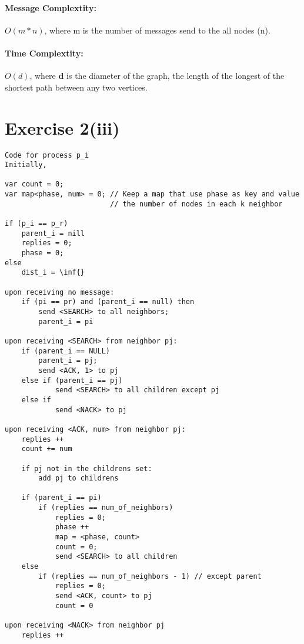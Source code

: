 \paragraph{Message Complextity:} $O(m*n)$, where m is the number of
messages send to the all nodes (n).

\paragraph{Time Complextity:} $O(d)$, where $\textbf{d}$ is the
diameter of the graph, the length of the longest of the shortest path
between any two vertices. 

\section*{Exercise 2(iii)}

\begin{lstlisting}[style=mycode]
Code for process p_i
Initially, 

var count = 0;
var map<phase, num> = 0; // Keep a map that use phase as key and value
						 // the number of nodes in each k neighbor

if (p_i == p_r)
	parent_i = nill
	replies = 0;
	phase = 0;
else
	dist_i = \inf{}

upon receiving no message:
	if (pi == pr) and (parent_i == null) then
		send <SEARCH> to all neighbors;
		parent_i = pi

upon receiving <SEARCH> from neighbor pj:
	if (parent_i == NULL)
		parent_i = pj;
		send <ACK, 1> to pj
	else if (parent_i == pj)
			send <SEARCH> to all children except pj
	else if 
			send <NACK> to pj

upon receiving <ACK, num> from neighbor pj:
	replies ++
	count += num

	if pj not in the childrens set:
		add pj to childrens

	if (parent_i == pi)
		if (replies == num_of_neighbors)
			replies = 0;
			phase ++
			map = <phase, count>
			count = 0;
			send <SEARCH> to all children
	else
		if (replies == num_of_neighbors - 1) // except parent
			replies = 0;
			send <ACK, count> to pj
			count = 0

upon receiving <NACK> from neighbor pj
	replies ++

\end{lstlisting}
